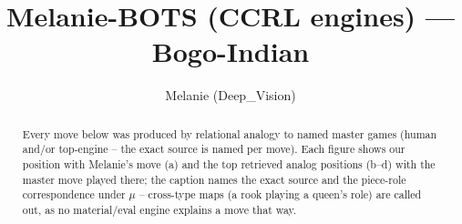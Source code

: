 \documentclass[11pt]{article}
\title{Melanie-BOTS (CCRL engines) — Bogo-Indian}
\author{Melanie (Deep\_Vision)}
\date{}
\begin{document}
\maketitle

\begin{abstract}Every move below was produced by relational analogy to named master games (human and/or top-engine -- the exact source is named per move). Each figure shows our position with Melanie's move (a) and the top retrieved analog positions (b--d) with the master move played there; the caption names the exact source and the piece-role correspondence under $\mu$ -- cross-type maps (a rook playing a queen's role) are called out, as no material/eval engine explains a move that way.\end{abstract}

\begin{figure}[p]\centering
\begin{subfigure}{0.46\textwidth}\centering
\resizebox{\linewidth}{!}{%
\newchessgame
\chessboard[
  setfen={r1b1k2r/ppppqppp/2n1pn2/8/2PP4/2b2NP1/PP1BPP1P/R2QKB1R w KQkq - 0 7},
  showmover=false,
  pgfstyle=straightmove, color=movearrow, markmove={d2-c3}
]}
\caption{}
\end{subfigure}\hfill
\begin{subfigure}{0.46\textwidth}\centering
\resizebox{\linewidth}{!}{%
\newchessgame
\chessboard[
  setfen={r1b1k2r/ppppqppp/2n1pn2/8/2PP4/2b2NP1/PP1BPP1P/R2QKB1R w KQkq - 0 7},
  showmover=false,
  pgfstyle=straightmove, color=movearrow, markmove={d2-c3}
]}
\caption{}
\end{subfigure}
\\[4pt]
\begin{subfigure}{0.46\textwidth}\centering
\resizebox{\linewidth}{!}{%
\newchessgame
\chessboard[
  setfen={r1b1k2r/ppppqppp/2n1pn2/8/2PP4/2b2NP1/PP1BPP1P/R2QKB1R w KQkq - 0 7},
  showmover=false,
  pgfstyle=straightmove, color=movearrow, markmove={d2-c3}
]}
\caption{}
\end{subfigure}\hfill
\begin{subfigure}{0.46\textwidth}\centering
\resizebox{\linewidth}{!}{%
\newchessgame
\chessboard[
  setfen={r1b1k2r/ppppqppp/2n1pn2/8/2PP4/2b2NP1/PP1BPP1P/R2QKB1R w KQkq - 0 7},
  showmover=false,
  pgfstyle=straightmove, color=movearrow, markmove={d2-c3}
]}
\caption{}
\end{subfigure}

\end{figure}
\end{document}
